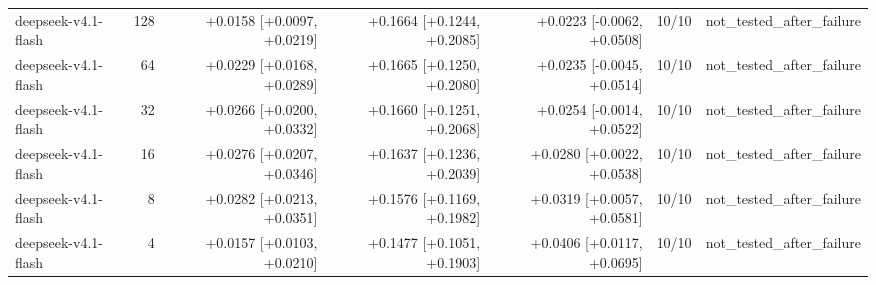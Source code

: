 \begin{longtable}{lrrrrrr}
deepseek-v4.1-flash & 128 & +0.0158 [+0.0097, +0.0219] & +0.1664 [+0.1244, +0.2085] & +0.0223 [-0.0062, +0.0508] & 10/10 & not\_tested\_after\_failure \\
deepseek-v4.1-flash & 64 & +0.0229 [+0.0168, +0.0289] & +0.1665 [+0.1250, +0.2080] & +0.0235 [-0.0045, +0.0514] & 10/10 & not\_tested\_after\_failure \\
deepseek-v4.1-flash & 32 & +0.0266 [+0.0200, +0.0332] & +0.1660 [+0.1251, +0.2068] & +0.0254 [-0.0014, +0.0522] & 10/10 & not\_tested\_after\_failure \\
deepseek-v4.1-flash & 16 & +0.0276 [+0.0207, +0.0346] & +0.1637 [+0.1236, +0.2039] & +0.0280 [+0.0022, +0.0538] & 10/10 & not\_tested\_after\_failure \\
deepseek-v4.1-flash & 8 & +0.0282 [+0.0213, +0.0351] & +0.1576 [+0.1169, +0.1982] & +0.0319 [+0.0057, +0.0581] & 10/10 & not\_tested\_after\_failure \\
deepseek-v4.1-flash & 4 & +0.0157 [+0.0103, +0.0210] & +0.1477 [+0.1051, +0.1903] & +0.0406 [+0.0117, +0.0695] & 10/10 & not\_tested\_after\_failure \\
\bottomrule
\end{longtable}
